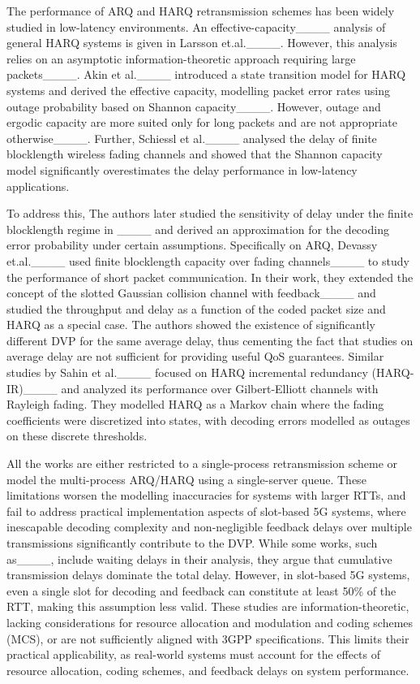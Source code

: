 The performance of ARQ and HARQ retransmission schemes has been widely studied in low-latency environments. 
An effective-capacity____ analysis of general HARQ systems is given in Larsson et.al.____. However, this analysis relies on an asymptotic information-theoretic approach requiring large packets____.
Akin et al.____ introduced a state transition model for HARQ systems and derived the effective capacity, modelling packet error rates using outage probability based on Shannon capacity____. However, outage and ergodic capacity are more suited only for long packets and are not appropriate otherwise____. 
Further, Schiessl et al.____ analysed the delay of finite blocklength wireless fading channels and showed that the Shannon capacity model significantly overestimates the delay performance in low-latency applications. 


To address this, The authors later studied the sensitivity of delay under the finite blocklength regime in ____ and derived an approximation for the decoding error probability under certain assumptions. 
Specifically on ARQ, Devassy et.al.____ used finite blocklength capacity over fading channels____ to study the performance of short packet communication.
In their work, they extended the concept of the slotted Gaussian collision channel with feedback____ and studied the throughput and delay as a function of the coded packet size and HARQ as a special case. The authors showed the existence of significantly different DVP for the same average delay, thus cementing the fact that studies on average delay are not sufficient for providing useful QoS guarantees. Similar studies by Sahin et al.____ focused on HARQ incremental redundancy (HARQ-IR)____ and analyzed its performance over Gilbert-Elliott channels with Rayleigh fading. They modelled HARQ as a Markov chain where the fading coefficients were discretized into states, with decoding errors modelled as outages on these discrete thresholds.


All the works are either restricted to a single-process retransmission scheme or model the multi-process ARQ/HARQ using a single-server queue. 
These limitations worsen the modelling inaccuracies for systems with larger RTTs, and fail to address practical implementation aspects of slot-based 5G systems, where inescapable decoding complexity and non-negligible feedback delays over multiple transmissions significantly contribute to the DVP.
While some works, such as____, include waiting delays in their analysis, they argue that cumulative transmission delays dominate the total delay. However, in slot-based 5G systems, even a single slot for decoding and feedback can constitute at least 50\% of the RTT, making this assumption less valid.
These studies are information-theoretic, lacking considerations for resource allocation and modulation and coding schemes (MCS), or are not sufficiently aligned with 3GPP specifications.
This limits their practical applicability, as real-world systems must account for the effects of resource allocation, coding schemes, and feedback delays on system performance.